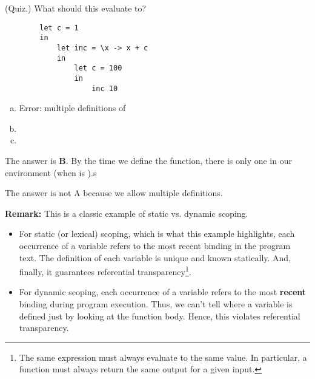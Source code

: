 \documentclass[letterpaper]{article}
\begin{document}
\begin{mdframed}[]
    (Quiz.) What should this evaluate to? 
    \begin{verbatim}
        let c = 1
        in 
            let inc = \x -> x + c 
            in 
                let c = 100
                in 
                    inc 10 \end{verbatim}
    \begin{enumerate}[(a)]
        \item Error: multiple definitions of 
        \item {}
        \item {}
    \end{enumerate}

    \begin{mdframed}[]
        The answer is \textbf{B}. By the time we define the  function, there is only one  in our environment (when  is ).s

        \bigskip 

        The answer is not A because we allow multiple definitions.
    \end{mdframed}
\end{mdframed}
\textbf{Remark:} This is a classic example of static vs. dynamic scoping. 
\begin{itemize}
    \item For static (or lexical) scoping, which is what this example highlights, each occurrence of a variable refers to the most recent binding in the program text. The definition of each variable is unique and known statically. And, finally, it guarantees referential transparency\footnote{The same expression must always evaluate to the same value. In particular, a function must always return the same output for a given input.}. 
    \item For dynamic scoping, each occurrence of a variable refers to the most \textbf{recent} binding during program execution. Thus, we can't tell where a variable is defined just by looking at the function body. Hence, this violates referential transparency. 
\end{itemize}
\end{document}
